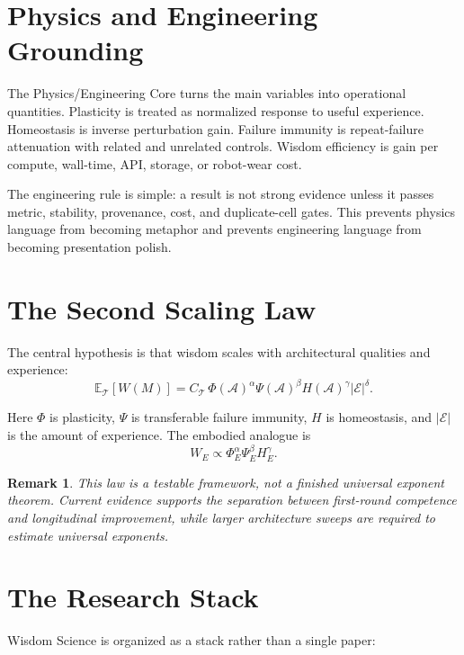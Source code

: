 \documentclass[11pt]{article}
\newtheorem{remark}{Remark}
\begin{document}
\section{Physics and Engineering Grounding}

The Physics/Engineering Core turns the main variables into operational quantities.
Plasticity is treated as normalized response to useful experience.
Homeostasis is inverse perturbation gain.
Failure immunity is repeat-failure attenuation with related and unrelated controls.
Wisdom efficiency is gain per compute, wall-time, API, storage, or robot-wear cost.

The engineering rule is simple: a result is not strong evidence unless it passes metric, stability, provenance, cost, and duplicate-cell gates.
This prevents physics language from becoming metaphor and prevents engineering language from becoming presentation polish.

\section{The Second Scaling Law}

The central hypothesis is that wisdom scales with architectural qualities and experience:
\[
\mathbb{E}_{\mathcal{T}}[W(M)]
= C_{\mathcal{T}}\,
\Phi(\mathcal{A})^{\alpha}
\Psi(\mathcal{A})^{\beta}
H(\mathcal{A})^{\gamma}
|\mathcal{E}|^{\delta}.
\]

Here $\Phi$ is plasticity, $\Psi$ is transferable failure immunity, $H$ is homeostasis, and $|\mathcal{E}|$ is the amount of experience.
The embodied analogue is
\[
W_E \propto \Phi_E^\alpha\Psi_E^\beta H_E^\gamma.
\]

\begin{remark}
This law is a testable framework, not a finished universal exponent theorem.
Current evidence supports the separation between first-round competence and longitudinal improvement, while larger architecture sweeps are required to estimate universal exponents.
\end{remark}

\section{The Research Stack}

Wisdom Science is organized as a stack rather than a single paper:
\end{document}
